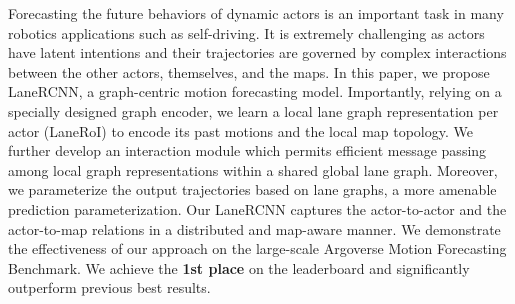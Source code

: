 Forecasting the future behaviors of dynamic actors is an important task in many robotics
applications such as self-driving.  
It is extremely challenging as actors have latent intentions 
and their trajectories are governed by complex interactions between the other actors,
themselves, and the maps.
In this paper, we propose LaneRCNN, 
a graph-centric motion forecasting model.
Importantly, relying on a specially designed graph encoder, we learn a local
lane graph representation per actor (LaneRoI) to encode its past motions and the local map topology.
We further develop an interaction module which permits efficient message
passing among local graph representations within a shared global lane graph.
Moreover, we parameterize the output trajectories based on lane graphs, a more amenable prediction parameterization.
Our LaneRCNN captures the actor-to-actor and the actor-to-map relations in a distributed and map-aware manner.
We demonstrate the effectiveness of our approach on the large-scale Argoverse Motion
Forecasting Benchmark. We achieve the \textbf{1st place} on the leaderboard and
significantly outperform previous best results.

